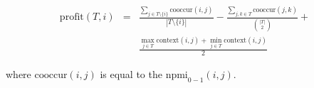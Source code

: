 \documentclass{article}
\begin{document}
\begin{eqnarray}
    \text{profit}(T, i) &=& \frac{\sum_{j \in T \setminus \{ i \}} \text{cooccur}(i, j)}{|T \setminus \{ i \}|} - \frac{\sum_{j, k \in T} \text{cooccur}(j, k)}{\binom{|T|}{2}} + \\
                         && \frac{\max_{j \in T} \text{context}(i, j) + \min_{j \in T} \text{context}(i, j)}{2}
\end{eqnarray}

where $\text{cooccur}(i, j)$ is equal to the $\text{npmi}_{0-1}(i, j)$.
\end{document}
